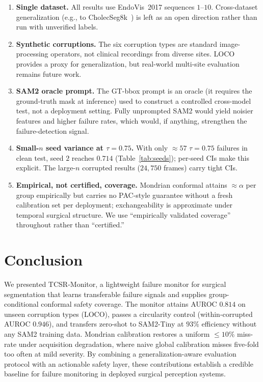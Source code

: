 \documentclass[letterpaper, 10 pt, conference]{ieeeconf}  %
\newcommand{\monitor}{TCSR-Monitor}
\begin{document}
\begin{enumerate}
\item \textbf{Single dataset.} All results use EndoVis~2017 sequences
$1$--$10$. Cross-dataset generalization (e.g., to
CholecSeg8k~\cite{ref:cholec}) is left as an open direction rather than run
with unverified labels.
\item \textbf{Synthetic corruptions.} The six corruption types are standard
image-processing operators, not clinical recordings from diverse sites. LOCO
provides a proxy for generalization, but real-world multi-site evaluation
remains future work.
\item \textbf{SAM2 oracle prompt.} The GT-bbox prompt is an oracle (it
requires the ground-truth mask at inference) used to construct a controlled
cross-model test, not a deployment setting. Fully unprompted SAM2 would yield
noisier features and higher failure rates, which would, if anything,
strengthen the failure-detection signal.
\item \textbf{Small-$n$ seed variance at $\tau=0.75$.} With only $\approx 57$
$\tau=0.75$ failures in clean test, seed $2$ reaches $0.714$
(Table~\ref{tab:seeds}); per-seed CIs make this explicit. The large-$n$
corrupted results ($24{,}750$ frames) carry tight CIs.
\item \textbf{Empirical, not certified, coverage.} Mondrian conformal attains
$\approx \alpha$ per group empirically but carries no PAC-style guarantee
without a fresh calibration set per deployment; exchangeability is approximate
under temporal surgical structure. We use ``empirically validated coverage''
throughout rather than ``certified.''
\end{enumerate}

\section{Conclusion}

We presented \monitor{}, a lightweight failure monitor for surgical
segmentation that learns transferable failure signals and supplies
group-conditional conformal safety coverage. The monitor attains AUROC
$0.814$ on unseen corruption types (LOCO), passes a circularity control
(within-corrupted AUROC $0.946$), and transfers zero-shot to SAM2-Tiny at
$93\%$ efficiency without any SAM2 training data. Mondrian calibration
restores a uniform $\le 10\%$ miss-rate under acquisition degradation, where
naive global calibration misses five-fold too often at mild severity. By
combining a generalization-aware evaluation protocol with an actionable
safety layer, these contributions establish a credible baseline for failure
monitoring in deployed surgical perception systems.
\end{document}
